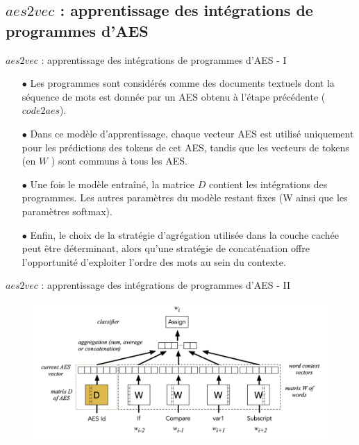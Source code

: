 \documentclass[xcolor=dvipsnames]{beamer}
\begin{document}
\subsection{$aes2vec$ : apprentissage des intégrations de programmes d'AES}
\begin{frame}{$aes2vec$ : apprentissage des intégrations de programmes d'AES - I}
\small{
\begin{itemize}
\item[$\bullet$] Les programmes sont considérés comme des documents textuels dont la séquence de mots est donnée par un AES obtenu à l'étape précédente ($code2aes$).

\item[$\bullet$] Dans ce modèle d'apprentissage, chaque vecteur AES est utilisé uniquement pour les prédictions des tokens de cet AES, tandis que les vecteurs de tokens (en $W$ ) sont communs à tous les AES. 

\item[$\bullet$] Une fois le modèle entraîné, la matrice $D$ contient les intégrations des programmes. Les autres paramètres du modèle restant fixes (W ainsi que les paramètres softmax).

\item[$\bullet$] Enfin, le choix de la stratégie d'agrégation utilisée dans la couche cachée peut être déterminant, alors qu'une stratégie de concaténation offre l'opportunité d'exploiter l'ordre des mots au sein du contexte.
\end{itemize}
}
\end{frame}

\begin{frame}{$aes2vec$ : apprentissage des intégrations de programmes d'AES - II}
\begin{figure}[ht]
\begin{center}
\includegraphics[width= \textwidth]{./images/Figure_4.png}
\end{center}
\end{figure}
\end{frame}
\end{document}
